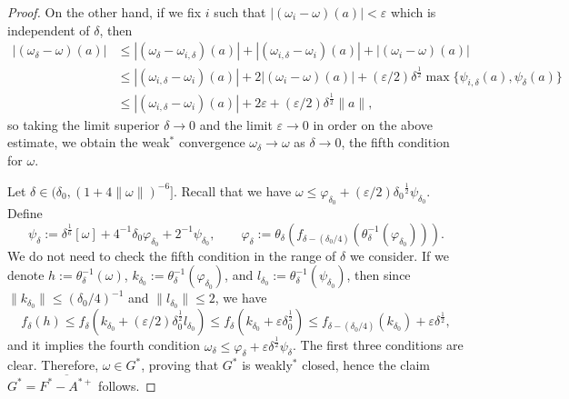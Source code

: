 \documentclass[noamsfonts,a4paper,10pt]{amsart}
\theoremstyle{plain}
\theoremstyle{definition}
\theoremstyle{remark}
\begin{document}
\begin{proof}
On the other hand, if we fix $i$ such that $|(\omega_i-\omega)(a)|<\varepsilon$ which is independent of $\delta$, then
\begin{align*}
|(\omega_\delta-\omega)(a)|
&\le|(\omega_\delta-\omega_{i,\delta})(a)|+|(\omega_{i,\delta}-\omega_i)(a)|+|(\omega_i-\omega)(a)|\\
&\le|(\omega_{i,\delta}-\omega_i)(a)|+2|(\omega_i-\omega)(a)|+(\varepsilon/2)\delta^\frac12\max\{\psi_{i,\delta}(a),\psi_\delta(a)\}\\
&\le|(\omega_{i,\delta}-\omega_i)(a)|+2\varepsilon+(\varepsilon/2)\delta^{\frac12}\|a\|,
\end{align*}
so taking the limit superior $\delta\to0$ and the limit $\varepsilon\to0$ in order on the above estimate, we obtain the weak$^*$ convergence $\omega_\delta\to\omega$ as $\delta\to0$, the fifth condition for $\omega$.

Let $\delta\in(\delta_0,(1+4\|\omega\|)^{-6}]$.
Recall that we have $\omega\le\varphi_{\delta_0}+(\varepsilon/2){\delta_0}^{\frac12}\psi_{\delta_0}$.
Define
\[\psi_\delta:=\delta^{\frac16}[\omega]+4^{-1}\delta_0\varphi_{\delta_0}+2^{-1}\psi_{\delta_0},\qquad\varphi_\delta:=\theta_\delta(f_{\delta-(\delta_0/4)}(\theta_\delta^{-1}(\varphi_{\delta_0}))).\]
We do not need to check the fifth condition in the range of $\delta$ we consider.
If we denote $h:=\theta_\delta^{-1}(\omega)$, $k_{\delta_0}:=\theta_\delta^{-1}(\varphi_{\delta_0})$, and $l_{\delta_0}:=\theta_\delta^{-1}(\psi_{\delta_0})$, then since $\|k_{\delta_0}\|\le(\delta_0/4)^{-1}$ and $\|l_{\delta_0}\|\le2$, we have
\[f_\delta(h)\le f_\delta(k_{\delta_0}+(\varepsilon/2)\delta_0^{\frac12}l_{\delta_0})\le f_\delta(k_{\delta_0}+\varepsilon\delta_0^{\frac12})\le f_{\delta-(\delta_0/4)}(k_{\delta_0})+\varepsilon\delta^\frac12,\]
and it implies the fourth condition $\omega_\delta\le\varphi_\delta+\varepsilon\delta^{\frac12}\psi_\delta$.
The first three conditions are clear.
Therefore, $\omega\in G^*$, proving that $G^*$ is weakly$^*$ closed, hence the claim $G^*=\overline{F^*-A^{*+}}$ follows.
\end{proof}
\end{document}
